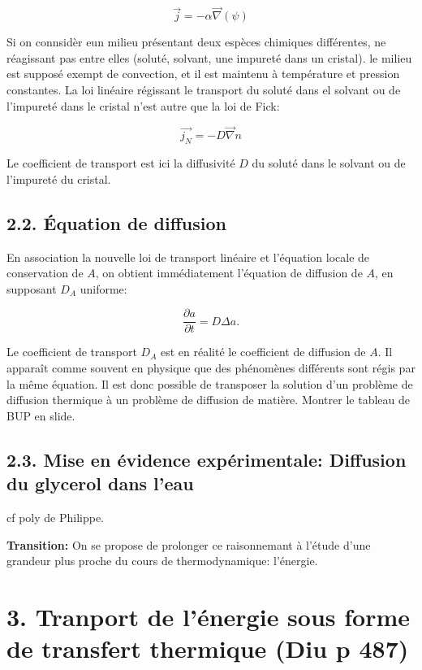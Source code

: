 \documentclass[french, a4paper, 10pt, twocolumn, landscape]{article}
\begin{document}
\begin{equation}
  \vec{j}=-\alpha\vec{\nabla}(\psi)
\end{equation}

Si on connsidèr eun milieu présentant deux espèces chimiques différentes, ne réagissant pas entre elles (soluté, solvant, une impureté dans un cristal). le milieu est supposé exempt de convection, et il est maintenu à température et pression constantes. La loi linéaire régissant le transport du soluté dans el solvant ou de l'impureté dans le cristal n'est autre que la loi de Fick:

\begin{equation}
  \vec{j_N}=-D\vec{\nabla}n
\end{equation}

Le coefficient de transport est ici la diffusivité $D$ du soluté dans le solvant ou de l'impureté du cristal.

\subsection*{2.2. Équation de diffusion}
En association la nouvelle loi de transport linéaire et l'équation locale de conservation de $A$, on obtient immédiatement l'équation de diffusion de $A$, en supposant $D_A$ uniforme:

\begin{equation}
  \dfrac{\partial a}{\partial t}=D\Delta a.
\end{equation}

Le coefficient de transport $D_A$ est en réalité le coefficient de diffusion de $A$.  Il apparaît comme souvent en physique que des phénomènes différents sont régis par la même équation.  Il est donc possible de transposer la solution d'un problème de diffusion thermique à un problème de diffusion de matière. Montrer le tableau de BUP en slide.

\subsection*{2.3. Mise en évidence expérimentale: Diffusion du glycerol dans l'eau}

cf poly de Philippe.

\textbf{Transition:} On se propose de prolonger ce raisonnemant à l'étude d'une grandeur plus proche du cours de thermodynamique: l'énergie.

\section*{3. Tranport de l'énergie sous forme de transfert thermique (Diu p 487)}
\end{document}
